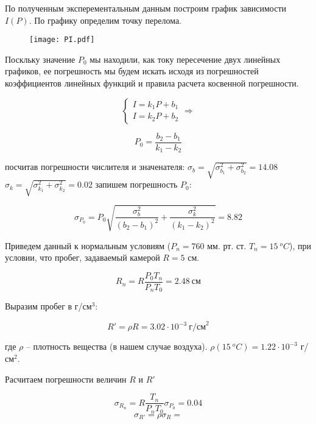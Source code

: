     

    По полученным эксперементальным данным построим график зависимости $I(P)$. По графику определим точку перелома.

    \begin{figure}
        \centering
        \texttt{[image: PI.pdf]}
        \caption{}
        \label{fig:1}
    \end{figure}

    \begin{center}
    \end{center}
    
    Поскльку значение $P_0$ мы находили, как току пересечение двух линейных графиков, ее погрешность
    мы будем искать исходя из погрешностей коэффициентов линейных функций и правила расчета косвенной погрешности.

    \begin{equation*}
        \begin{cases}
            I = k_1 P + b_1 \\
            I = k_2 P + b_2
        \end{cases}
        \Rightarrow
    \end{equation*}

    \[ P_0 = \frac{b_2 - b_1}{k_1 - k_2} \]

    посчитав погрешности числителя и значенателя: $\sigma_b = \sqrt{\sigma_{b_1}^2 + \sigma_{b_2}^2} = 14.08$
    $\sigma_k = \sqrt{\sigma_{k_1}^2 + \sigma_{k_2}^2} = 0.02$ запишем погрешность $P_0$:

    \[ \sigma_{P_0} = P_0 \sqrt{\frac{\sigma_b^2}{(b_2 - b_1)^2} + \frac{\sigma_k^2}{(k_1 - k_2)^2}} = 8.82 \]

    Приведем данный к нормальным условиям ($P_n = 760$ мм. рт. ст. $T_n = 15 ~ ^oC$), при условии,
    что пробег, задаваемый камерой $R = 5$ см.

    \[ R_n = R \frac{P_0 T_n}{P_n T_0} = 2.48 ~ \text{см} \]

    Выразим пробег в г/см$^3$:

    \[ R' = \rho R = 3.02 \cdot 10^{-3} ~ \text{г/см}^2 \]

    где $\rho$ -- плотность вещества (в нашем случае воздуха). $\rho(15 ~ ^oC) = 1.22 \cdot 10^{-3}$ г/см$^2$.

    Расчитаем погрешности величин $R$ и $R'$

    \[ \sigma_{R_n} = R \frac{T_n}{P_n T_0} \sigma_{P_0} = 0.04 \]
    \[ \sigma_{R'} = \rho \sigma_R =  \]


